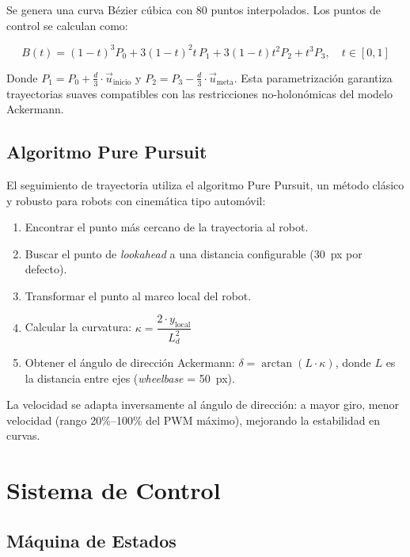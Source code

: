 \documentclass[11pt,a4paper]{article}
\begin{document}
Se genera una curva Bézier cúbica con 80 puntos interpolados. Los puntos de control se calculan como:

\[
B(t) = (1-t)^3 P_0 + 3(1-t)^2 t\, P_1 + 3(1-t) t^2 P_2 + t^3 P_3, \quad t \in [0, 1]
\]

Donde $P_1 = P_0 + \frac{d}{3} \cdot \vec{u}_{\text{inicio}}$ y $P_2 = P_3 - \frac{d}{3} \cdot \vec{u}_{\text{meta}}$. Esta parametrización garantiza trayectorias suaves compatibles con las restricciones no-holonómicas del modelo Ackermann.

\subsection{Algoritmo Pure Pursuit}

El seguimiento de trayectoria utiliza el algoritmo Pure Pursuit, un método clásico y robusto para robots con cinemática tipo automóvil:

\begin{enumerate}[nosep]
    \item Encontrar el punto más cercano de la trayectoria al robot.
    \item Buscar el punto de \textit{lookahead} a una distancia configurable (30~px por defecto).
    \item Transformar el punto al marco local del robot.
    \item Calcular la curvatura: $\kappa = \dfrac{2 \cdot y_{\text{local}}}{L_d^2}$
    \item Obtener el ángulo de dirección Ackermann: $\delta = \arctan(L \cdot \kappa)$, donde $L$ es la distancia entre ejes (\textit{wheelbase} = 50~px).
\end{enumerate}

La velocidad se adapta inversamente al ángulo de dirección: a mayor giro, menor velocidad (rango 20\%--100\% del PWM máximo), mejorando la estabilidad en curvas.

\section{Sistema de Control}

\subsection{Máquina de Estados}
\end{document}

